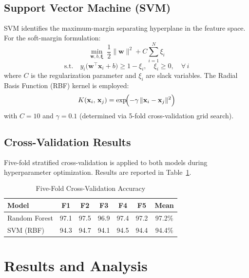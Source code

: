 \documentclass[conference]{IEEEtran}
\begin{document}
\subsection{Support Vector Machine (SVM)}

SVM identifies the maximum-margin separating hyperplane in the 
feature space. For the soft-margin formulation:
\begin{equation}
    \min_{\mathbf{w}, b, \boldsymbol{\xi}}\ 
    \frac{1}{2}\|\mathbf{w}\|^2 + C\sum_{i=1}^{N}\xi_i
    \label{eq:svm_primal}
\end{equation}
\begin{equation*}
    \text{s.t.}\quad 
    y_i\bigl(\mathbf{w}^{\!\top}\mathbf{x}_i + b\bigr) 
    \geq 1 - \xi_i, \quad \xi_i \geq 0, \quad \forall\, i
\end{equation*}
where $C$ is the regularization parameter and $\xi_i$ are slack 
variables. The Radial Basis Function (RBF) kernel is employed:
\begin{equation}
    K(\mathbf{x}_i,\, \mathbf{x}_j) =
    \exp\!\Bigl(-\gamma\,\|\mathbf{x}_i - \mathbf{x}_j\|^2\Bigr)
    \label{eq:rbf}
\end{equation}
with $C = 10$ and $\gamma = 0.1$ (determined via 5-fold 
cross-validation grid search).

\subsection{Cross-Validation Results}

Five-fold stratified cross-validation is applied to both models 
during hyperparameter optimization. Results are reported in 
Table~\ref{tab:cv}.

\begin{table}[htbp]
\caption{Five-Fold Cross-Validation Accuracy}
\label{tab:cv}
\centering
\renewcommand{\arraystretch}{1.2}
\begin{tabular}{lcccccc}
\toprule
\textbf{Model} & \textbf{F1} & \textbf{F2} & 
\textbf{F3} & \textbf{F4} & \textbf{F5} & 
\textbf{Mean} \\
\midrule
Random Forest & 97.1 & 97.5 & 96.9 & 97.4 & 97.2 & 97.2\% \\
SVM (RBF)     & 94.3 & 94.7 & 94.1 & 94.5 & 94.4 & 94.4\% \\
\bottomrule
\end{tabular}
\end{table}

\section{Results and Analysis}
\label{sec:results}
\end{document}
